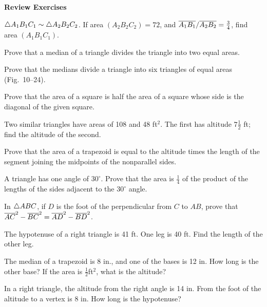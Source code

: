 \documentclass[11pt]{book}
\begin{document}
\par\medskip\begin{center}\bfseries Review Exercises\end{center}\par\nopagebreak
\begin{exlist}
\item $\triangle A_1B_1C_1 \sim \triangle A_2B_2C_2$. If area $(A_2B_2C_2) = 72$, and
  $\overline{A_1B_1}/\overline{A_2B_2} = \tfrac{3}{4}$, find area $(A_1B_1C_1)$.
\item Prove that a median of a triangle divides the triangle into two equal
  areas.
\item[\stex 3.] Prove that the medians divide a triangle into six triangles of
  equal areas (Fig.~10--24).
\exfig{\FIGXTWENTYFOUR}
\item[4.] Prove that the area of a square is half the area of a square whose
  side is the diagonal of the given square.
\item[5.] Two similar triangles have areas of 108 and 48 ft$^2$. The first has
  altitude $7\frac{1}{2}$ ft; find the altitude of the second.
\item[6.] Prove that the area of a trapezoid is equal to the altitude times the
  length of the segment joining the midpoints of the nonparallel sides.
\item[7.] A triangle has one angle of $30^\circ$. Prove that the area is
  $\frac{1}{4}$ of the product of the lengths of the sides adjacent to the
  $30^\circ$ angle.
\item[8.] In $\triangle ABC$, if $D$ is the foot of the perpendicular from $C$ to
  $AB$, prove that $\overline{AC}^2 - \overline{BC}^2 = \overline{AD}^2 - \overline{BD}^2$.
\item[9.] The hypotenuse of a right triangle is 41 ft. One leg is 40 ft. Find
  the length of the other leg.
\item[10.] The median of a trapezoid is 8 in., and one of the bases is 12 in.
  How long is the other base? If the area is $\frac{1}{2}$ft$^2$, what is the
  altitude?
\item[11.] In a right triangle, the altitude from the right angle is 14 in.
  From the foot of the altitude to a vertex is 8 in. How long is the
  hypotenuse?
\end{exlist}
\end{document}
